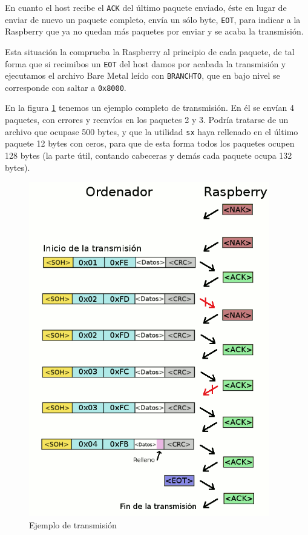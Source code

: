 En cuanto el host recibe el {\tt ACK} del último paquete enviado, éste en lugar de enviar
de nuevo un paquete completo, envía un sólo byte, {\tt EOT}, para indicar a la Raspberry
que ya no quedan más paquetes por enviar y se acaba la transmisión.

Esta situación la comprueba la Raspberry al principio de cada paquete, de tal forma que si
recimibos un {\tt EOT} del host damos por acabada la transmisión y ejecutamos el archivo
Bare Metal leído con {\tt BRANCHTO}, que en bajo nivel se corresponde con saltar a {\tt 0x8000}.

En la figura \ref{fig:transm} tenemos un ejemplo completo de transmisión. En él se envían 4
paquetes, con errores y reenvíos en los paquetes 2 y 3. Podría tratarse de un archivo que
ocupase 500 bytes, y que la utilidad {\tt sx} haya rellenado en el último paquete 12 bytes
con ceros, para que de esta forma todos los paquetes ocupen 128 bytes (la parte útil, contando
cabeceras y demás cada paquete ocupa 132 bytes).

\begin{figure}[h]
  \centering
    \includegraphics[width=10.5cm]{graphs/transm.png}
  \caption{Ejemplo de transmisión}
  \label{fig:transm}
\end{figure}

\chapterend
